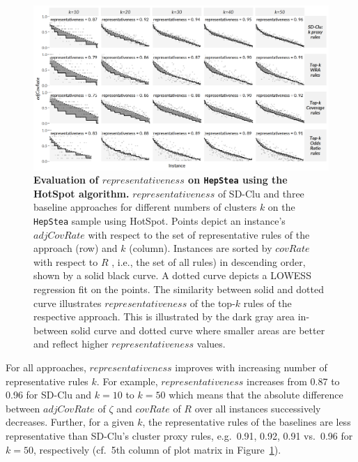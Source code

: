 \documentclass[
  oneside]{book}
\begin{document}
\begin{figure}[htbp]

{\centering \includegraphics[width=1\linewidth]{figures/04-representativeness-hepStea-hotSpot} 

}

\caption{\textbf{Evaluation of \(representativeness\) on \texttt{HepStea} using the HotSpot algorithm.} \(representativeness\) of SD-Clu and three baseline approaches for different numbers of clusters \(k\) on the \texttt{HepStea} sample using HotSpot. Points depict an instance's \(adjCovRate\) with respect to the set of representative rules of the approach (row) and \(k\) (column). Instances are sorted by \(covRate\) with respect to \(R\) , i.e., the set of all rules) in descending order, shown by a solid black curve. A dotted curve depicts a LOWESS regression fit on the points. The similarity between solid and dotted curve illustrates \(representativeness\) of the top-\(k\) rules of the respective approach. This is illustrated by the dark gray area in-between solid curve and dotted curve where smaller areas are better and reflect higher \(representativeness\) values.}\label{fig:04-representativeness-hepStea-hotSpot}
\end{figure}

For all approaches, \(representativeness\) improves with increasing number of representative rules \(k\).
For example, \(representativeness\) increases from 0.87 to 0.96 for SD-Clu and \(k=10\) to \(k=50\) which means that the absolute difference between \(adjCovRate\) of \(\zeta\) and \(covRate\) of \(R\) over all instances successively decreases.
Further, for a given \(k\), the representative rules of the baselines are less representative than SD-Clu's cluster proxy rules, e.g.~0.91, 0.92, 0.91 vs.~0.96 for \(k=50\), respectively (cf.~5th column of plot matrix in Figure~\ref{fig:04-representativeness-hepStea-hotSpot}).
\end{document}
